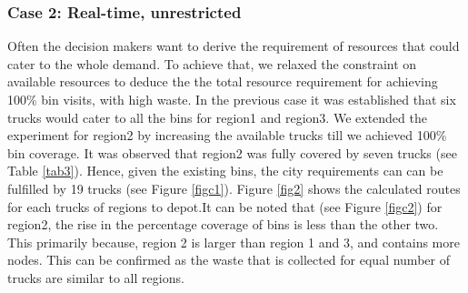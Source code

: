 \documentclass[12pt]{article}
\begin{document}
\subsubsection*{Case 2: Real-time, unrestricted}

Often the decision makers want to derive the requirement of resources that could cater to the whole demand. To achieve that, we relaxed the constraint on available resources to deduce the the total resource requirement for achieving 100\% bin visits, with high waste. In the previous case it was established that six trucks would cater to all the bins for region1 and region3. We extended the experiment for region2 by increasing the available trucks till we achieved 100\% bin coverage. It was observed that region2 was fully covered by seven trucks (see Table \ref{tab3}). Hence, given the existing bins, the city requirements can can be  fulfilled by 19 trucks (see Figure \ref{figc1}). Figure \ref{fig2} shows the calculated routes for each trucks of regions to depot.It can be noted that (see Figure \ref{figc2}) for region2, the rise in the percentage coverage of bins is less than the other two. This primarily because, region 2 is larger than region 1 and 3, and contains more nodes. This can be confirmed as the waste that is collected for equal number of trucks are similar to all regions. 
\end{document}
